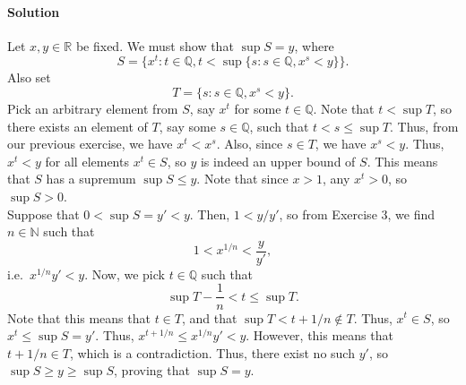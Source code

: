 \documentclass[10pt]{article}
\def\solution{\paragraph{Solution}}
\begin{document}
\begin{enumerate}
                \solution Let $x, y \in \mathbb{R}$ be fixed. We must show that $\sup{S} = y$, where
                \[
                        S = \{x^t: t \in \mathbb{Q}, t < \sup\{s: s\in \mathbb{Q}, x^s < y\}\}.
                \]
                Also set
                \[
                        T = \{s: s\in \mathbb{Q}, x^s < y\}.
                \]
                Pick an arbitrary element from $S$, say $x^{t}$ for some $t \in \mathbb{Q}$. Note that $t < \sup{T}$, so 
                there exists an element of $T$, say some $s \in \mathbb{Q}$, such that $t < s \leq \sup{T}$. Thus, from our previous
                exercise, we have $x^t < x^s$. Also, since $s \in T$, we have $x^s < y$. Thus, $x^t < y$ for all elements $x^t \in S$,
                so $y$ is indeed an upper bound of $S$. This means that $S$ has a supremum $\sup{S} \leq y$.
                Note that since $x > 1$, any $x^t > 0$, so $\sup{S} > 0$. \\
                
                Suppose that $0 < \sup{S} = y' < y$. Then, $1< y /y'$, so from Exercise 3, we find $n \in \mathbb{N}$ such that
                \[ 1 < x^{1 /n} < \frac{y}{y'},\]
                i.e.\ $x^{1 /n}y' < y$. Now, we pick $t \in \mathbb{Q}$ such that 
                \[ \sup T - \frac{1}{n} < t \leq \sup T. \]
                Note that this means that $t \in T$, and that $\sup{T} < t + 1 /n \notin T$. Thus, $x^t \in S$, so $x^t \leq \sup{S} = y'$.
                Thus, $x^{t + 1 /n} \leq x^{1 /n}y' < y$. However, this means that $t + 1 /n \in T$, which is a contradiction.
                Thus, there exist no such $y'$, so $\sup{S} \geq y \geq \sup{S}$, proving that $\sup{S} = y$.

                
        \end{enumerate}
\end{document}
